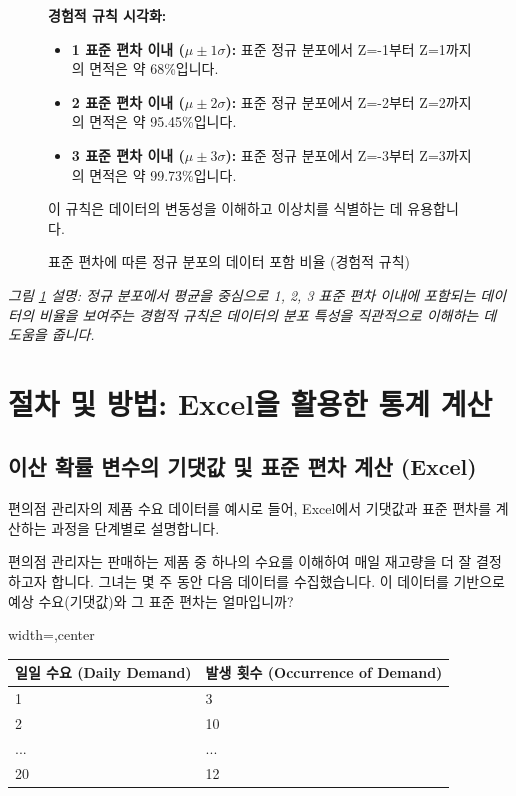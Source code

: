 \documentclass[11pt,a4paper]{article}
\begin{document}
\begin{figure}[h!]
    \centering
    \begin{tcolorbox}[colback=white, colframe=black, title=\textbf{표준 편차에 따른 정규 분포의 데이터 포함 비율}]
    \textbf{경험적 규칙 시각화:}
    \begin{itemize}
        \item \textbf{1 표준 편차 이내 ($\mu \pm 1\sigma$):} 표준 정규 분포에서 Z=-1부터 Z=1까지의 면적은 약 68\%입니다.
        \item \textbf{2 표준 편차 이내 ($\mu \pm 2\sigma$):} 표준 정규 분포에서 Z=-2부터 Z=2까지의 면적은 약 95.45\%입니다.
        \item \textbf{3 표준 편차 이내 ($\mu \pm 3\sigma$):} 표준 정규 분포에서 Z=-3부터 Z=3까지의 면적은 약 99.73\%입니다.
    \end{itemize}
    이 규칙은 데이터의 변동성을 이해하고 이상치를 식별하는 데 유용합니다.
    \end{tcolorbox}
    \caption{표준 편차에 따른 정규 분포의 데이터 포함 비율 (경험적 규칙)}
    \label{fig:empirical_rule}
\end{figure}
\textit{그림 \ref{fig:empirical_rule} 설명: 정규 분포에서 평균을 중심으로 1, 2, 3 표준 편차 이내에 포함되는 데이터의 비율을 보여주는 경험적 규칙은 데이터의 분포 특성을 직관적으로 이해하는 데 도움을 줍니다.}

\newpage
\section*{절차 및 방법: Excel을 활용한 통계 계산}

\subsection{이산 확률 변수의 기댓값 및 표준 편차 계산 (Excel)}
편의점 관리자의 제품 수요 데이터를 예시로 들어, Excel에서 기댓값과 표준 편차를 계산하는 과정을 단계별로 설명합니다.

\begin{examplebox}[문제 상황]
편의점 관리자는 판매하는 제품 중 하나의 수요를 이해하여 매일 재고량을 더 잘 결정하고자 합니다. 그녀는 몇 주 동안 다음 데이터를 수집했습니다. 이 데이터를 기반으로 예상 수요(기댓값)와 그 표준 편차는 얼마입니까?
\end{examplebox}

\begin{adjustbox}{width=\textwidth,center}
\begin{tabular}{ll}
\toprule
\textbf{일일 수요 (Daily Demand)} & \textbf{발생 횟수 (Occurrence of Demand)} \\
\midrule
1 & 3 \\
2 & 10 \\
... & ... \\
20 & 12 \\
\bottomrule
\end{tabular}
\end{adjustbox}
\label{tab:demand_data}
\end{document}
